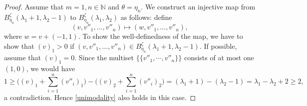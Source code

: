 \documentclass[12pt,reqno]{amsart}
\theoremstyle{definition}
\theoremstyle{remark}
\begin{document}
\begin{proof}

Assume that $m=1, n\in\mathbb{N}$ and $\theta=\eta_n$. We construct an injective map from $B^{\zeta}_{\eta_{n}}(\lambda_{1}+1,\lambda_{2}-1)$ to $B^{\zeta}_{\eta_{n}}(\lambda_{1},\lambda_{2})$ as follows: define 
$$(v,v''_{1},\dotsc,v''_{n})\mapsto (w,v''_{1},\dotsc,v''_{n}),$$
where $w=v+(-1,1)$. To show the well-definedness of the map, we have to show that $(v)_{1}>0$ if $(v,v''_{1},\dotsc,v''_{n})\in B^{\zeta}_{\eta_{n}}(\lambda_{1}+1,\lambda_{2}-1)$. If possible, assume that $(v)_{1}=0$. Since the multiset $\{\{v''_{1},\cdots,v''_{n}\}\}$ consists of at most one $(1,0)$, we would have $$1\geq \bigg((v)_{1}+\sum_{i=1}^{n}(v''_{i})_1\bigg)-\bigg((v)_{2} + \sum_{i=1}^{n}(v''_{i})_2\bigg) = (\lambda_{1}+1)-(\lambda_{2}-1)=\lambda_{1}-\lambda_{2}+2\geq 2,$$ a contradiction.
Hence \eqref{unimodality} also holds in this case.

\end{proof}
\end{document}
